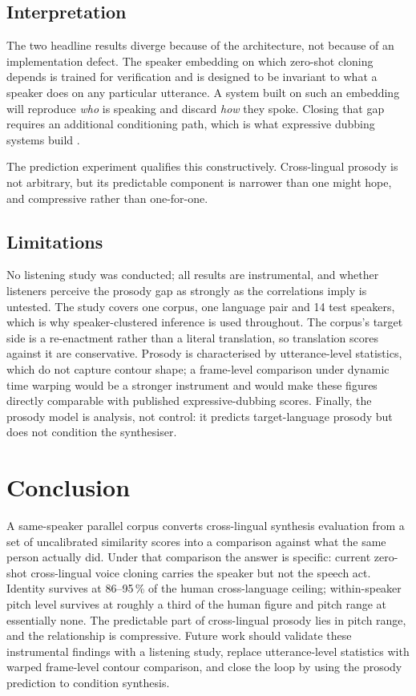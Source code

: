 \documentclass[journal]{IEEEtran}
\begin{document}
\subsection{Interpretation}
The two headline results diverge because of the architecture, not because of an implementation
defect. The speaker embedding on which zero-shot cloning depends is trained for verification and is
designed to be invariant to what a speaker does on any particular utterance. A system built on such
an embedding will reproduce \emph{who} is speaking and discard \emph{how} they spoke. Closing that
gap requires an additional conditioning path, which is what expressive dubbing systems build
\cite{swiatkowski2023dubbing,song2023styles2st}.

The prediction experiment qualifies this constructively. Cross-lingual prosody is not arbitrary,
but its predictable component is narrower than one might hope, and compressive rather than
one-for-one.

\subsection{Limitations}
No listening study was conducted; all results are instrumental, and whether listeners perceive the
prosody gap as strongly as the correlations imply is untested. The study covers one corpus, one
language pair and 14 test speakers, which is why speaker-clustered inference is used throughout.
The corpus's target side is a re-enactment rather than a literal translation, so translation scores
against it are conservative. Prosody is characterised by utterance-level statistics, which do not
capture contour shape; a frame-level comparison under dynamic time warping would be a stronger
instrument and would make these figures directly comparable with published expressive-dubbing
scores. Finally, the prosody model is analysis, not control: it predicts target-language prosody but
does not condition the synthesiser.

\section{Conclusion}
A same-speaker parallel corpus converts cross-lingual synthesis evaluation from a set of
uncalibrated similarity scores into a comparison against what the same person actually did. Under
that comparison the answer is specific: current zero-shot cross-lingual voice cloning carries the
speaker but not the speech act. Identity survives at 86--95\,\% of the human cross-language ceiling;
within-speaker pitch level survives at roughly a third of the human figure and pitch range at
essentially none. The predictable part of cross-lingual prosody lies in pitch range, and the
relationship is compressive. Future work should validate these instrumental findings with a
listening study, replace utterance-level statistics with warped frame-level contour comparison, and
close the loop by using the prosody prediction to condition synthesis.
\end{document}
